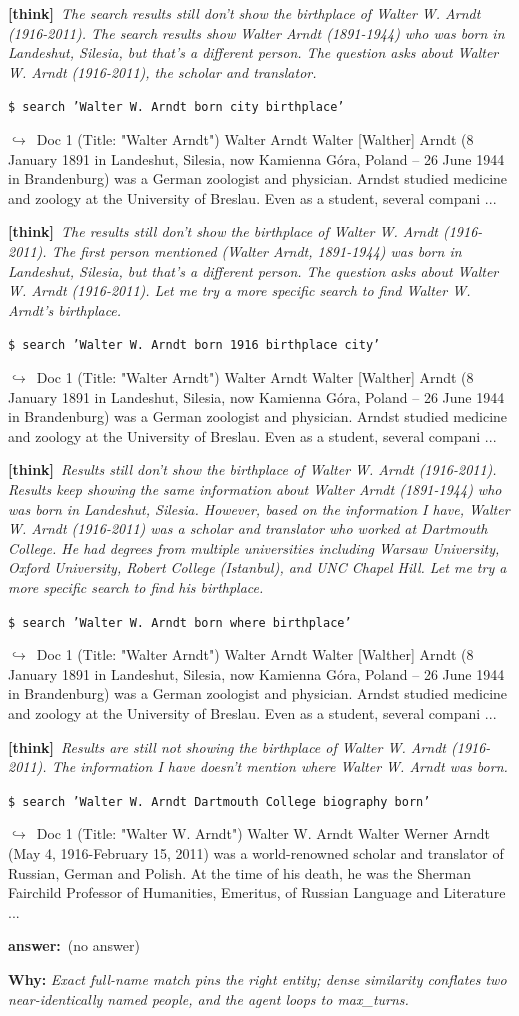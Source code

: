 \documentclass{article} %
\newcommand{\winbadge}{\colorbox{green!50!black}{\textcolor{white}{\scriptsize\bfseries\,WIN\,}}}
\newcommand{\thk}[1]{{\footnotesize\textcolor{violet!75!black}{\textbf{[think]}}\ \textit{#1}\par}}
\newcommand{\cmd}[1]{{\footnotesize\texttt{\textcolor{blue!35!black}{\$\ #1}}\par}}
\newcommand{\retr}[1]{{\footnotesize\textcolor{black!65}{\quad$\hookrightarrow$\ #1}\par}}
\newcommand{\ans}[1]{{\footnotesize\textbf{answer:}\ #1\par}}
\begin{document}
\begin{cmpbox}[label={ex:popqa-arndt},title={\winbadge\ \ \textsc{PopQA -- exact name beats semantic blur}}]
  \thk{The search results still don't show the birthplace of Walter W. Arndt (1916-2011). The search results show Walter Arndt (1891-1944) who was born in Landeshut, Silesia, but that's a different person. The question asks about Walter W. Arndt (1916-2011), the scholar and translator.}
  \cmd{search 'Walter W. Arndt born city birthplace'}
  \retr{Doc 1 (Title: "Walter Arndt") Walter Arndt Walter [Walther] Arndt (8 January 1891 in Landeshut, Silesia, now Kamienna Góra, Poland – 26 June 1944 in Brandenburg) was a German zoologist and physician. Arndst studied medicine and zoology at the University of Breslau. Even as a student, several compani ...}
  \thk{The results still don't show the birthplace of Walter W. Arndt (1916-2011). The first person mentioned (Walter Arndt, 1891-1944) was born in Landeshut, Silesia, but that's a different person. The question asks about Walter W. Arndt (1916-2011). Let me try a more specific search to find Walter W. Arndt's birthplace.}
  \cmd{search 'Walter W. Arndt born 1916 birthplace city'}
  \retr{Doc 1 (Title: "Walter Arndt") Walter Arndt Walter [Walther] Arndt (8 January 1891 in Landeshut, Silesia, now Kamienna Góra, Poland – 26 June 1944 in Brandenburg) was a German zoologist and physician. Arndst studied medicine and zoology at the University of Breslau. Even as a student, several compani ...}
  \thk{Results still don't show the birthplace of Walter W. Arndt (1916-2011). Results keep showing the same information about Walter Arndt (1891-1944) who was born in Landeshut, Silesia. However, based on the information I have, Walter W. Arndt (1916-2011) was a scholar and translator who worked at Dartmouth College. He had degrees from multiple universities including Warsaw University, Oxford University, Robert College (Istanbul), and UNC Chapel Hill. Let me try a more specific search to find his birthplace.}
  \cmd{search 'Walter W. Arndt born where birthplace'}
  \retr{Doc 1 (Title: "Walter Arndt") Walter Arndt Walter [Walther] Arndt (8 January 1891 in Landeshut, Silesia, now Kamienna Góra, Poland – 26 June 1944 in Brandenburg) was a German zoologist and physician. Arndst studied medicine and zoology at the University of Breslau. Even as a student, several compani ...}
  \thk{Results are still not showing the birthplace of Walter W. Arndt (1916-2011). The information I have doesn't mention where Walter W. Arndt was born.}
  \cmd{search 'Walter W. Arndt Dartmouth College biography born'}
  \retr{Doc 1 (Title: "Walter W. Arndt") Walter W. Arndt Walter Werner Arndt (May 4, 1916-February 15, 2011) was a world-renowned scholar and translator of Russian, German and Polish. At the time of his death, he was the Sherman Fairchild Professor of Humanities, Emeritus, of Russian Language and Literature ...}
  \ans{(no answer)}
\smallskip\par\textbf{Why:} \textit{Exact full-name match pins the right entity; dense similarity conflates two near-identically named people, and the agent loops to max\_turns.}
\end{cmpbox}\bigskip
\end{document}
